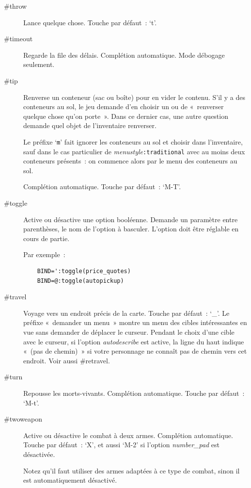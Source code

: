 \documentclass[titlepage]{article}
\begin{document}
\begin{description}
\item[{\#throw}]
Lance quelque chose.
Touche par défaut~: `t'.

\item[{\#timeout}]
Regarde la file des délais.
Complétion automatique.
Mode débogage seulement.

\item[{\#tip}]
Renverse un conteneur (sac ou boîte) pour en vider le contenu.
S'il y a des conteneurs au sol, le jeu demande d'en choisir un ou de
«~renverser quelque chose qu'on porte~».
Dans ce dernier cas, une autre question demande quel objet de
l'inventaire renverser.


Le préfixe `\texttt{m}' fait ignorer les conteneurs au sol et choisir
dans l'inventaire, sauf dans le cas particulier de
\textit{menustyle}\texttt{:traditional}
avec au moins deux conteneurs présents~: on commence alors par le menu des
conteneurs au sol.


Complétion automatique.
Touche par défaut~: `M-T'.

\item[{\#toggle}]
Active ou désactive une option booléenne.
Demande un paramètre entre parenthèses, le nom de l'option à basculer.
L'option doit être réglable en cours de partie.


Par exemple~:
\begin{verbatim}
    BIND=':toggle(price_quotes)
    BIND=@:toggle(autopickup)
\end{verbatim}

\item[{\#travel}]
Voyage vers un endroit précis de la carte.
Touche par défaut~: `\_'. 
Le préfixe «~demander un menu~» montre un menu des cibles
intéressantes en vue sans demander de déplacer le curseur.
Pendant le choix d'une cible avec le curseur, si l'option
\textit{autodescribe}
est active, la ligne du haut indique «~(pas de chemin)~» si votre
personnage ne connaît pas de chemin vers cet endroit.
Voir aussi \#retravel.

\item[{\#turn}]
Repousse les morts-vivants.
Complétion automatique.
Touche par défaut~: `M-t'.

\item[{\#twoweapon}]
Active ou désactive le combat à deux armes.
Complétion automatique.
Touche par défaut~: `X', et aussi `M-2' si l'option
\textit{number\_pad}
est désactivée.


Notez qu'il faut utiliser des armes adaptées à ce type de combat, sinon il
est automatiquement désactivé.


\end{description}
\end{document}
